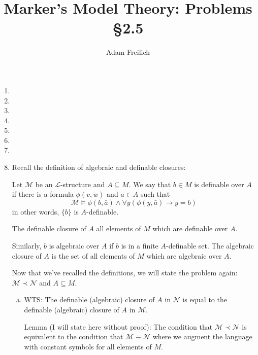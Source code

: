 \documentclass[10pt]{article}
\author{Adam Freilich}
\title{Marker's Model Theory: Problems \S 2.5}
\newcommand{\A}{\forall}
\newcommand{\mcM}{\mathcal{M}}
\newcommand{\mcN}{\mathcal{N}}
\newcommand{\mcL}{\mathcal{L}}
\begin{document}
\maketitle


\begin{enumerate}[1.]
\item
 
\item
 
\item
 
\item
 
\item

\item
 
\item
 
\item %
Recall the definition of algebraic and definable closures:

Let \(\mcM\) be an \(\mcL\)-structure and \(A \subseteq M\). 
We say that \(b \in M\) is definable over \(A\) if there is a formula \(\phi(v, \bar{w})\) and \(\bar{a} \in A\) such that
\[\mcM \models \phi(b, \bar{a}) \land \A y (\phi(y, \bar{a}) \to y = b)\]
in other words, \(\{b\}\) is \(A\)-definable. 

The definable closure of \(A\) all elements of \(M\) which are definable over \(A\).

Similarly, \(b\) is algebraic over \(A\) if \(b\) is in a finite \(A\)-definable set. 
The algebraic closure of \(A\) is the set of all elements of \(M\) which are algebraic over \(A\).

Now that we've recalled the definitions, we will state the problem again: 
\(\mcM \prec \mcN\) and \(A \subseteq M\).
\begin{enumerate}[a)]

\item WTS: The definable (algebraic) closure of \(A\) in \(\mcN\) is equal to the definable (algebraic) closure of \(A\) in \(\mcM\).

Lemma (I will state here without proof): The condition that \(\mcM \prec \mcN\) is equivalent to the condition that \(\mcM \equiv \mcN\) where we augment the language with constant symbols for all elements of \(M\). 


\end{enumerate}
\end{enumerate}
\end{document}
